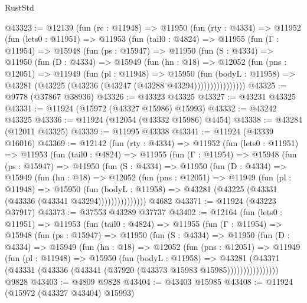 \begin{lexlean}{RustStd}
\begin{coremodule}
{\begin{coremodule}
{{{{{{{{{{{{{{{{{{{{{{{{{{{{{{{{{{{{{{{{{{{{{{{{{{{{{{{{{{{{{{{{{{{{{{{{{{{{{{{{@43323 := @12139
    (fun (rc : @11948) =>
    @11950
      (fun (rty : @4334) =>
      @11952
        (fun (lets0 : @11951) =>
        @11953
          (fun (tail0 : @4824) =>
          @11955
            (fun (Γ : @11954) =>
            @15948
              (fun (ps : @15947) =>
              @11950
                (fun (S : @4334) =>
                @11950
                  (fun (D : @4334) =>
                  @15949
                    (fun (hn : @18) =>
                    @12052
                      (fun (pns : @12051) =>
                      @11949
                        (fun (pl : @11948) =>
                        @15950
                          (fun (bodyL : @11958) =>
                          @43281 (@43225 (@43236 (@43247 (@43288 @43294))))))))))))))))
@43325 := @9778 (@37867 @38936)
@43326 := @43323 @43325
@43327 := @43231 @43325
@43331 := @11924 (@15972 (@43327 @15986) @15993)
@43332 := @43242 @43325
@43336 := @11924 (@12054 (@43332 @15986) @4454)
@43338 := @43284 (@12011 @43325)
@43339 := @11995 @43338
@43341 := @11924 (@43339 @16016)
@43369 := @12142
    (fun (rty : @4334) =>
    @11952
      (fun (lets0 : @11951) =>
      @11953
        (fun (tail0 : @4824) =>
        @11955
          (fun (Γ : @11954) =>
          @15948
            (fun (ps : @15947) =>
            @11950
              (fun (S : @4334) =>
              @11950
                (fun (D : @4334) =>
                @15949
                  (fun (hn : @18) =>
                  @12052
                    (fun (pns : @12051) =>
                    @11949
                      (fun (pl : @11948) =>
                      @15950
                        (fun (bodyL : @11958) =>
                        @43281 (@43225 (@43331 (@43336 (@43341 @43294)))))))))))))))
    @4682
@43371 := @11924 (@43223 @37917)
@43373 := @37553 @43289 @37737
@43402 := @12164
    (fun (lets0 : @11951) =>
    @11953
      (fun (tail0 : @4824) =>
      @11955
        (fun (Γ : @11954) =>
        @15948
          (fun (ps : @15947) =>
          @11950
            (fun (S : @4334) =>
            @11950
              (fun (D : @4334) =>
              @15949
                (fun (hn : @18) =>
                @12052
                  (fun (pns : @12051) =>
                  @11949
                    (fun (pl : @11948) =>
                    @15950
                      (fun (bodyL : @11958) =>
                      @43281
                        (@43371
                          (@43331 (@43336 (@43341 (@37920 (@43373 @15983 @15985))))))))))))))))
    @9828
@43403 := @4809 @9828
@43404 := @43403 @15985
@43408 := @11924 (@15972 (@43327 @43404) @15993)
}}}}}}}}}}}}}}}}}}}}}}}}}}}}}}}}}}}}}}}}}}}}}}}}}}}}}}}}}}}}}}}}}}}}}}}}}}}}}}}}
\end{coremodule}}
\end{coremodule}
\end{lexlean}
